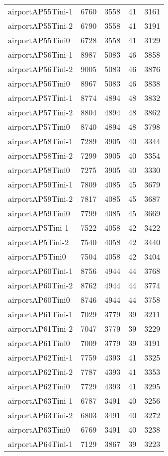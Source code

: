 \documentclass[../../../thesis.tex]{subfiles}
\begin{document}
\begin{longtable}{lrrrr}
airportAP55Tini-1 & 6760 & 3558 & 41 & 3161 \\
airportAP55Tini-2 & 6790 & 3558 & 41 & 3191 \\
airportAP55Tini0 & 6728 & 3558 & 41 & 3129 \\
airportAP56Tini-1 & 8987 & 5083 & 46 & 3858 \\
airportAP56Tini-2 & 9005 & 5083 & 46 & 3876 \\
airportAP56Tini0 & 8967 & 5083 & 46 & 3838 \\
airportAP57Tini-1 & 8774 & 4894 & 48 & 3832 \\
airportAP57Tini-2 & 8804 & 4894 & 48 & 3862 \\
airportAP57Tini0 & 8740 & 4894 & 48 & 3798 \\
airportAP58Tini-1 & 7289 & 3905 & 40 & 3344 \\
airportAP58Tini-2 & 7299 & 3905 & 40 & 3354 \\
airportAP58Tini0 & 7275 & 3905 & 40 & 3330 \\
airportAP59Tini-1 & 7809 & 4085 & 45 & 3679 \\
airportAP59Tini-2 & 7817 & 4085 & 45 & 3687 \\
airportAP59Tini0 & 7799 & 4085 & 45 & 3669 \\
airportAP5Tini-1 & 7522 & 4058 & 42 & 3422 \\
airportAP5Tini-2 & 7540 & 4058 & 42 & 3440 \\
airportAP5Tini0 & 7504 & 4058 & 42 & 3404 \\
airportAP60Tini-1 & 8756 & 4944 & 44 & 3768 \\
airportAP60Tini-2 & 8762 & 4944 & 44 & 3774 \\
airportAP60Tini0 & 8746 & 4944 & 44 & 3758 \\
airportAP61Tini-1 & 7029 & 3779 & 39 & 3211 \\
airportAP61Tini-2 & 7047 & 3779 & 39 & 3229 \\
airportAP61Tini0 & 7009 & 3779 & 39 & 3191 \\
airportAP62Tini-1 & 7759 & 4393 & 41 & 3325 \\
airportAP62Tini-2 & 7787 & 4393 & 41 & 3353 \\
airportAP62Tini0 & 7729 & 4393 & 41 & 3295 \\
airportAP63Tini-1 & 6787 & 3491 & 40 & 3256 \\
airportAP63Tini-2 & 6803 & 3491 & 40 & 3272 \\
airportAP63Tini0 & 6769 & 3491 & 40 & 3238 \\
airportAP64Tini-1 & 7129 & 3867 & 39 & 3223 \\

\end{longtable}
\end{document}

